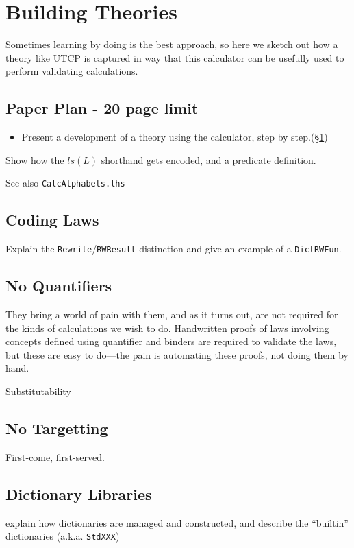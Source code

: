 \section{Building Theories}\label{sec:Theorising}

Sometimes learning by doing is the best approach,
so here we sketch out how a theory like UTCP
is captured in way that this calculator
can be usefully used to perform validating calculations.

\subsection*{Paper Plan - 20 page limit}

\begin{itemize}
  \item
     Present a development of a theory using the calculator,
     step by step.(\S\ref{sec:Theorising})
\end{itemize}

Show how the $ls(L)$ shorthand gets encoded,
and a predicate definition.

See also \texttt{CalcAlphabets.lhs}

\subsection{Coding Laws}\label{ssec:coding-laws}

Explain the \texttt{Rewrite}/\texttt{RWResult} distinction
and give an example of a \texttt{DictRWFun}.

\subsection{No Quantifiers}\label{ssec:no-quant}

    They bring a world of pain with them,
    and as it turns out, are not required
    for the kinds of calculations we wish to do.
    Handwritten proofs of laws involving concepts
    defined using quantifier and binders
    are required to validate the laws,
    but these are easy to do---the pain is automating these proofs,
    not doing them by hand.

    Substitutability

\subsection{No Targetting}\label{ssec:no-target}

First-come, first-served.

\subsection{Dictionary Libraries}

explain how dictionaries are managed and constructed,
and describe the ``builtin'' dictionaries (a.k.a. \texttt{StdXXX})
